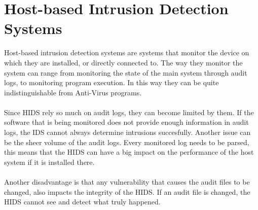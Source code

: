 \section{Host-based Intrusion Detection Systems}
Host-based intrusion detection systems are systems that monitor the device on which they are installed, or directly connected to. The way they monitor the system can range from monitoring the state of the main system through audit logs, to monitoring program execution. In this way they can be quite indistinguishable from Anti-Virus programs. \cite{sans}\\
\\
Since HIDS rely so much on audit logs, they can become limited by them. If the software that is being monitored does not provide enough information in audit logs, the IDS cannot always determine intrusions succesfully. Another issue can be the sheer volume of the audit logs. Every monitored log needs to be parsed, this means that the HIDS can have a big impact on the performance of the host system if it is installed there. \cite{Bace:1999:ID:347487} \\
\\
Another disadvantage is that any vulnerability that causes the audit files to be changed, also impacts the integrity of the HIDS. If an audit file is changed, the HIDS cannot see and detect what truly happened. \cite{Sundaram:1996:IID:332159.332161}

